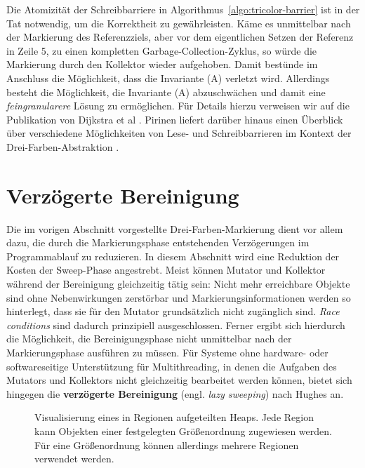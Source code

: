 Die Atomizität der Schreibbarriere  in Algorithmus~\ref{algo:tricolor-barrier} ist in der Tat notwendig, um die Korrektheit zu gewährleisten.
Käme es unmittelbar nach der Markierung des Referenzziels, aber vor dem eigentlichen Setzen der Referenz in Zeile 5, zu einen kompletten Garbage-Collection-Zyklus, so würde die Markierung durch den Kollektor wieder aufgehoben.
Damit bestünde im Anschluss die Möglichkeit, dass die Invariante (A) verletzt wird.
Allerdings besteht die Möglichkeit, die Invariante (A) abzuschwächen und damit eine \textit{feingranularere} Lösung zu ermöglichen.
Für Details hierzu verweisen wir auf die Publikation von Dijkstra et al \cite[S. 972ff]{dijkstra1978}.
Pirinen liefert darüber hinaus einen Überblick über verschiedene Möglichkeiten von Lese- und Schreibbarrieren im Kontext der Drei-Farben-Abstraktion \cite{pirinen}.


\section{Verzögerte Bereinigung}
\label{sec:lazy-sweep}
Die im vorigen Abschnitt vorgestellte Drei-Farben-Markierung dient vor allem dazu, die durch die Markierungsphase entstehenden Verzögerungen im Programmablauf zu reduzieren.
In diesem Abschnitt wird eine Reduktion der Kosten der Sweep-Phase angestrebt.
Meist können Mutator und Kollektor während der Bereinigung gleichzeitig tätig sein:
Nicht mehr erreichbare Objekte sind ohne Nebenwirkungen zerstörbar und Markierungsinformationen werden so hinterlegt, dass sie für den Mutator grundsätzlich nicht zugänglich sind.
\textit{Race conditions} sind dadurch prinzipiell ausgeschlossen.
Ferner ergibt sich hierdurch die Möglichkeit, die Bereinigungsphase nicht unmittelbar nach der Markierungsphase ausführen zu müssen.
Für Systeme ohne hardware- oder softwareseitige Unterstützung für Multithreading, in denen die Aufgaben des Mutators und Kollektors nicht gleichzeitig bearbeitet werden können, bietet sich hingegen die \textbf{verzögerte Bereinigung} (engl. \textit{lazy sweeping}) nach Hughes \cite{hughes} an.

\begin{figure}[h]
	\centering
	
	\caption[Visualisierung eines in Regionen aufgeteilten Heaps]{Visualisierung eines in Regionen aufgeteilten Heaps. Jede Region kann Objekten einer festgelegten Größenordnung zugewiesen werden. Für eine Größenordnung können allerdings mehrere Regionen verwendet werden.}
	\label{fig:heap-region}
\end{figure}

